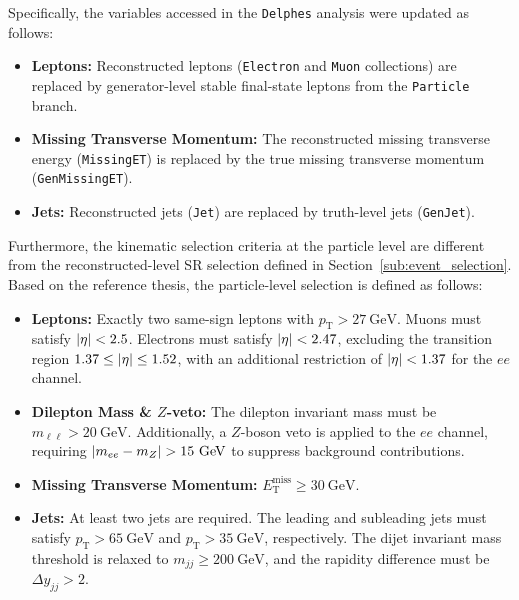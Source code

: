 \documentclass[12pt]{article}
\begin{document}
        Specifically, the variables accessed in the \verb|Delphes| analysis were updated as follows:
        \begin{itemize}
            \item \textbf{Leptons:} Reconstructed leptons (\verb|Electron| and \verb|Muon| collections) are replaced by generator-level stable final-state leptons from the \verb|Particle| branch.
            \item \textbf{Missing Transverse Momentum:} The reconstructed missing transverse energy (\verb|MissingET|) is replaced by the true missing transverse momentum (\verb|GenMissingET|).
            \item \textbf{Jets:} Reconstructed jets (\verb|Jet|) are replaced by truth-level jets (\verb|GenJet|).
        \end{itemize}

        Furthermore, the kinematic selection criteria at the particle level are different from the reconstructed-level SR selection defined in Section~\ref{sub:event_selection}. Based on the reference thesis, the particle-level selection is defined as follows:
        \begin{itemize}
            \item \textbf{Leptons:} Exactly two same-sign leptons with $p_{\text{T}} > 27~\mathrm{GeV}$. Muons must satisfy $\abs{\eta} < 2.5$. Electrons must satisfy $\abs{\eta} < 2.47$, excluding the transition region $1.37 \leq \abs{\eta} \leq 1.52$, with an additional restriction of $\abs{\eta} < 1.37$ for the $ee$ channel.

            \item \textbf{Dilepton Mass \& $Z$-veto:} The dilepton invariant mass must be $m_{\ell\ell} > 20~\mathrm{GeV}$. Additionally, a $Z$-boson veto is applied to the $ee$ channel, requiring $\abs{m_{ee} - m_{Z}} > 15~\mathrm{GeV}$ to suppress background contributions.

            \item \textbf{Missing Transverse Momentum:} $E_{\text{T}}^{\text{miss}} \geq 30~\mathrm{GeV}$.

            \item \textbf{Jets:} At least two jets are required. The leading and subleading jets must satisfy $p_{\text{T}} > 65~\mathrm{GeV}$ and $p_{\text{T}} > 35~\mathrm{GeV}$, respectively. The dijet invariant mass threshold is relaxed to $m_{jj} \geq 200~\mathrm{GeV}$, and the rapidity difference must be $\Delta y_{jj} > 2$.
        \end{itemize}
\end{document}
